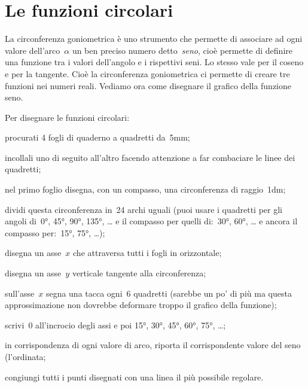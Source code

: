 \section{Le funzioni circolari}
\label{sec:gonio_funzionicircolari}

La circonferenza goniometrica è uno strumento che permette di associare ad 
ogni valore dell'arco~\(\alpha\) un ben preciso numero detto~\emph{seno},
cioè permette di definire una funzione tra i valori dell'angolo e i rispettivi
seni. Lo stesso vale per il coseno e per la tangente. 
Cioè la circonferenza goniometrica ci permette di creare tre funzioni nei 
numeri reali. Vediamo ora come disegnare il grafico della funzione seno.

\begin{procedura}
 Per disegnare le funzioni circolari:
 \begin{enumeratea}
  \item procurati 4 fogli di quaderno a quadretti da~5mm;
  \item incollali uno di seguito all'altro 
   facendo attenzione a far combaciare le linee dei quadretti;
  \item nel primo foglio disegna, con un compasso, una circonferenza di
   raggio~1dm;
  \item dividi questa circonferenza in~24 archi uguali 
   (puoi usare i quadretti per gli angoli di~0°, 45°, 90°, 135°, \dots 
   e il compasso per quelli di:~30°, 60°, \dots
   e ancora il compasso per:~15°, 75°, \dots);
  \item disegna un asse~\(x\) che attraversa tutti i fogli in orizzontale;
  \item disegna un asse~\(y\) verticale tangente alla circonferenza;
  \item sull'asse~\(x\) segna una tacca ogni~6 quadretti 
   (sarebbe un po' di più ma questa approssimazione non dovrebbe deformare 
   troppo il grafico della funzione);
  \item scrivi~0 all'incrocio degli assi e poi 15°, 30°, 45°, 60°, 75°, \dots;
  \item in corrispondenza di ogni valore di arco, riporta il corrispondente
   valore del seno (l'ordinata;
  \item congiungi tutti i punti disegnati con una linea il più possibile 
   regolare.
 \end{enumeratea}
\end{procedura}

